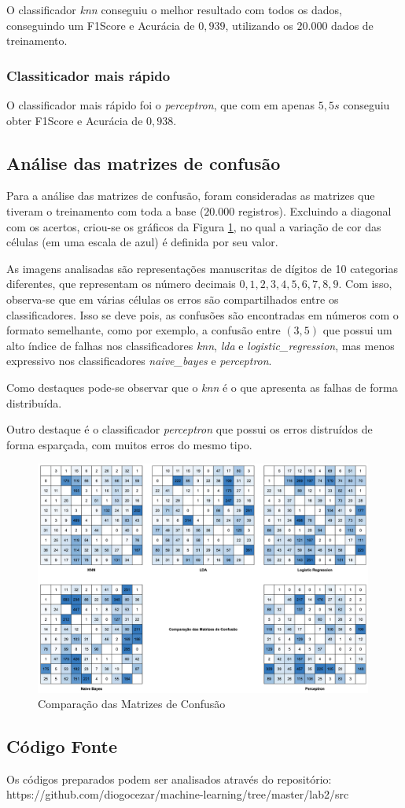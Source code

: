 \documentclass[12pt]{article}
\begin{document}
O classificador \textit{knn} conseguiu o melhor resultado com todos os dados, conseguindo um F1Score e Acurácia de $0,939$, utilizando os $20.000$ dados de treinamento.

\subsubsection{Classiticador mais rápido}

O classificador mais rápido foi o \textit{perceptron}, que com em apenas $5,5s$ conseguiu obter F1Score e Acurácia de $0,938$.

\subsection{Análise das matrizes de confusão}

Para a análise das matrizes de confusão, foram consideradas as matrizes que tiveram o treinamento com toda a base ($20.000$ registros). Excluindo a diagonal com os acertos, criou-se os gráficos da Figura \ref{fig:comparacao_conf_mat}, no qual a variação de cor das células (em uma escala de azul) é definida por seu valor.

As imagens analisadas são representações manuscritas de dígitos de 10 categorias diferentes, que representam os número decimais $0,1,2,3,4,5,6,7,8,9$. Com isso, observa-se que em várias células os erros são compartilhados entre os classificadores. Isso se deve pois, as confusões são encontradas em números com o formato semelhante, como por exemplo, a confusão entre $(3,5)$ que possui um alto índice de falhas nos classificadores \textit{knn}, \textit{lda} e \textit{logistic\_regression}, mas menos expressivo nos classificadores \textit{naive\_bayes} e \textit{perceptron}.

Como destaques pode-se observar que o \textit{knn} é o que apresenta as falhas de forma distribuída.

Outro destaque é o classificador \textit{perceptron} que possui os erros distruídos de forma esparçada, com muitos erros do mesmo tipo.

\begin{figure}[!htb]
  \centering
  \includegraphics[width=30em]{images/image_comparacao_conf_mat.png}
  \caption{Comparação das Matrizes de Confusão}
  \label{fig:comparacao_conf_mat}
\end{figure}

\subsection{Código Fonte}

Os códigos preparados podem ser analisados através do repositório: https://github.com/diogocezar/machine-learning/tree/master/lab2/src
\end{document}
